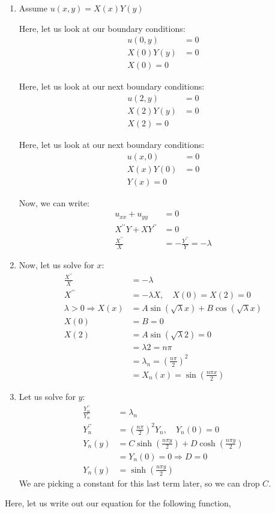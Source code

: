 \documentclass{article}
\begin{document}
\begin{enumerate}
  \item Assume $u(x, y) = X(x)Y(y)$

  Here, let us look at our boundary conditions:
  \begin{align}
    u(0, y) & = 0\\
    X(0)Y(y) & = 0\\
    X(0) = 0
  \end{align}

  Here, let us look at our next boundary conditions:
  \begin{align}
    u(2, y) & = 0\\
    X(2)Y(y) & = 0\\
    X(2) = 0
  \end{align}

  Here, let us look at our next boundary conditions:
  \begin{align}
    u(x, 0) & = 0\\
    X(x)Y(0) & = 0\\
    Y(x) = 0
  \end{align}

  Now, we can write:
  \begin{align}
    u_{xx} + u_{yy} & = 0\\
    X^{\prime\prime}Y + XY^{\prime\prime} & = 0\\
    \frac{X^{\prime\prime}}{X} & = -\frac{Y^{\prime\prime}}{Y} = - \lambda
  \end{align}
  \item Now, let us solve for $x$:
  \begin{align}
    \frac{X^{\prime\prime}}{X} & = -\lambda\\
    X^{\prime\prime} & = - \lambda X, \quad X(0) = X(2) = 0\\
    \lambda > 0 \Rightarrow X(x) & = A \sin(\sqrt \lambda x) + B \cos(\sqrt \lambda x)\\
    X(0) & = B = 0\\
    X(2) & = A \sin(\sqrt \lambda 2) = 0\\
    & = \lambda 2 = n \pi\\
    & = \lambda_n = \left( \frac{n \pi}{2} \right)^2\\
    & = X_n(x) =  \sin(\frac{n \pi x}{2})
  \end{align}
  \item Let us solve for $y$:
  \begin{align}
    \frac{Y^{\prime\prime}_n}{Y_n} & = \lambda_n\\
    Y^{\prime\prime}_n & = \left(\frac{n \pi}{2}\right)^2 Y_n, \quad Y_n(0) = 0\\
    Y_n(y) & = C \sinh \left( \frac{n \pi y}{2} \right) + D \cosh \left( \frac{n \pi y}{2} \right)\\
    & = Y_n(0) = 0 \Rightarrow D = 0\\
    Y_n(y) & = \sinh \left( \frac{n \pi y}{2} \right)
  \end{align}
  We are picking a constant for this last term later, so we can drop $C$.
\end{enumerate}
Here, let us write out our equation for the following function,
\end{document}
